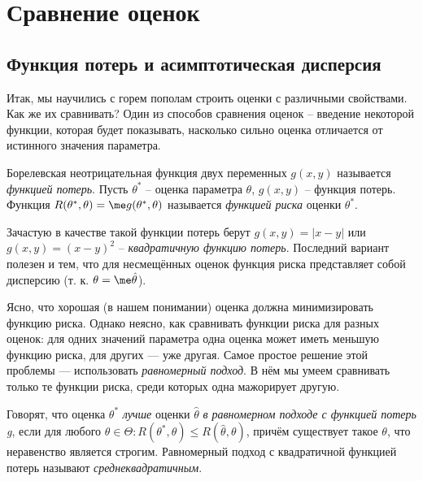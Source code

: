 \section{Сравнение оценок}

\subsection{Функция потерь и асимптотическая дисперсия}\label{compare_methods}

Итак, мы научились с горем пополам строить оценки с различными свойствами. Как же их сравнивать? Один из способов сравнения оценок -- введение некоторой функции, которая будет показывать, насколько сильно оценка отличается от истинного значения параметра.

\begin{definition}
Борелевская неотрицательная функция двух переменных $g(x, y)$ называется \textit{функцией потерь}. Пусть $\theta^*$ -- оценка параметра $\theta$, $g(x, y)$ -- функция потерь. Функция $R(\theta^*, \theta) = \me g(\theta^*, \theta)$ называется \textit{функцией риска} оценки $\theta^*$.
\end{definition}

Зачастую в качестве такой функции потерь берут $g(x, y) = |x - y|$ или $g(x, y) = (x - y)^2$ -- \textit{квадратичную функцию потерь}. Последний вариант полезен и тем, что для несмещённых оценок функция риска представляет собой дисперсию (т. к. $\theta = \me\hat{\theta}$).

Ясно, что хорошая (в нашем понимании) оценка должна минимизировать функцию риска. Однако неясно, как сравнивать функции риска для разных оценок: для одних значений параметра одна оценка может иметь меньшую функцию риска, для других --- уже другая. Самое простое решение этой проблемы --- использовать \textit{равномерный подход}. В нём мы умеем сравнивать только те функции риска, среди которых одна мажорирует другую.

\begin{definition}
    Говорят, что оценка $\theta^*$ \textit{лучше} оценки $\hat \theta$ \textit{в равномерном подходе с функцией потерь g}, если для любого $\theta \in \Theta\colon R(\theta^*, \theta) \le R(\hat\theta, \theta)$, причём существует такое $\theta$, что неравенство является строгим. Равномерный подход с квадратичной функцией потерь называют \textit{среднеквадратичным}.
\end{definition}

